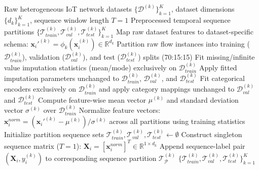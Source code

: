 \documentclass[a4paper,fleqn]{cas-sc}
\begin{document}
\begin{algorithm}
\caption{Dataset Preprocessing and Temporal Sequence Construction Pipeline}
\label{alg:preprocessing}
\begin{algorithmic}[1]
\REQUIRE Raw heterogeneous IoT network datasets $\{\mathcal{D}^{(k)}\}_{k=1}^{K}$, dataset dimensions $\{d_k\}_{k=1}^{K}$, sequence window length $T=1$
\ENSURE Preprocessed temporal sequence partitions $\{\mathcal{T}_{train}^{(k)}, \mathcal{T}_{val}^{(k)}, \mathcal{T}_{test}^{(k)}\}_{k=1}^{K}$
    \STATE Map raw dataset features to dataset-specific schema: $\mathbf{x}_i'^{(k)} = \phi_k(\mathbf{x}_i^{(k)}) \in \mathbb{R}^{d_k}$
    \STATE Partition raw flow instances into training ($\mathcal{D}_{train}^{(k)}$), validation ($\mathcal{D}_{val}^{(k)}$), and test ($\mathcal{D}_{test}^{(k)}$) splits (70:15:15)
    \STATE Fit missing/infinite value imputation statistics (mean/mode) exclusively on $\mathcal{D}_{train}^{(k)}$
    \STATE Apply fitted imputation parameters unchanged to $\mathcal{D}_{train}^{(k)}$, $\mathcal{D}_{val}^{(k)}$, and $\mathcal{D}_{test}^{(k)}$
    \STATE Fit categorical encoders exclusively on $\mathcal{D}_{train}^{(k)}$ and apply category mappings unchanged to $\mathcal{D}_{val}^{(k)}$ and $\mathcal{D}_{test}^{(k)}$
    \STATE Compute feature-wise mean vector $\mu^{(k)}$ and standard deviation vector $\sigma^{(k)}$ over $\mathcal{D}_{train}^{(k)}$
    \STATE Normalize feature vectors: $\mathbf{x}_i^{norm} = (\mathbf{x}_i'^{(k)} - \mu^{(k)}) / \sigma^{(k)}$ across all partitions using training statistics
    \STATE Initialize partition sequence sets $\mathcal{T}_{train}^{(k)}, \mathcal{T}_{val}^{(k)}, \mathcal{T}_{test}^{(k)} \leftarrow \emptyset$
            \STATE Construct singleton sequence matrix ($T=1$): $\mathbf{X}_i = [\mathbf{x}_i^{norm}]^T \in \mathbb{R}^{1 \times d_k}$
            \STATE Append sequence-label pair $(\mathbf{X}_i, y_i^{(k)})$ to corresponding sequence partition $\mathcal{T}_{\mathcal{P}}^{(k)}$
        \ENDFOR
    \ENDFOR
\ENDFOR
\RETURN $\{\mathcal{T}_{train}^{(k)}, \mathcal{T}_{val}^{(k)}, \mathcal{T}_{test}^{(k)}\}_{k=1}^{K}$
\end{algorithmic}
\end{algorithm}
\end{document}
